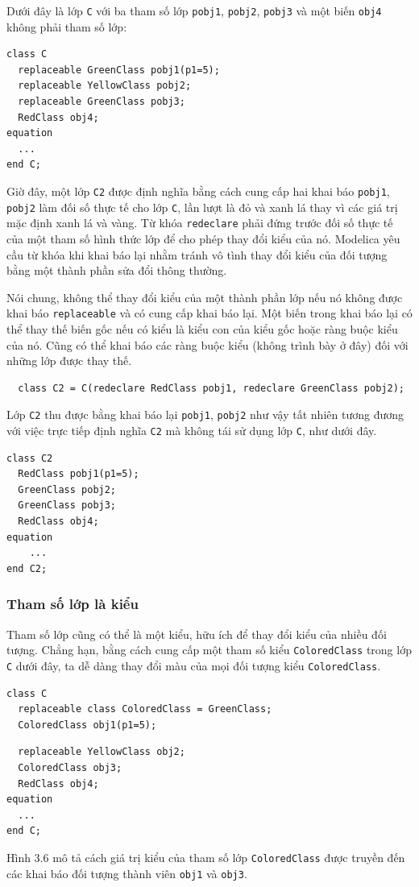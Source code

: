 Dưới đây là lớp \texttt{C} với ba tham số lớp \texttt{pobj1}, \texttt{pobj2}, \texttt{pobj3} và một biến \texttt{obj4} không phải tham số lớp:
\begin{verbatim}
class C
  replaceable GreenClass pobj1(p1=5);
  replaceable YellowClass pobj2;
  replaceable GreenClass pobj3;
  RedClass obj4;
equation
  ...
end C;
\end{verbatim}
Giờ đây, một lớp \texttt{C2} được định nghĩa bằng cách cung cấp hai khai báo \texttt{pobj1}, \texttt{pobj2} làm đối số thực tế cho lớp \texttt{C}, lần lượt là đỏ và xanh lá thay vì các giá trị mặc định xanh lá và vàng. Từ khóa \texttt{redeclare} phải đứng trước đối số thực tế của một tham số hình thức lớp để cho phép thay đổi kiểu của nó. Modelica yêu cầu từ khóa khi khai báo lại nhằm tránh vô tình thay đổi kiểu của đối tượng bằng một thành phần sửa đổi thông thường.

Nói chung, không thể thay đổi kiểu của một thành phần lớp nếu nó không được khai báo \texttt{replaceable} và có cung cấp khai báo lại. Một biến trong khai báo lại có thể thay thế biến gốc nếu có kiểu là kiểu con của kiểu gốc hoặc ràng buộc kiểu của nó. Cũng có thể khai báo các ràng buộc kiểu (không trình bày ở đây) đối với những lớp được thay thế.
\begin{verbatim}
  class C2 = C(redeclare RedClass pobj1, redeclare GreenClass pobj2);
\end{verbatim}
Lớp \texttt{C2} thu được bằng khai báo lại \texttt{pobj1}, \texttt{pobj2} như vậy tất nhiên tương đương với việc trực tiếp định nghĩa \texttt{C2} mà không tái sử dụng lớp \texttt{C}, như dưới đây.
\begin{verbatim}
class C2
  RedClass pobj1(p1=5);
  GreenClass pobj2;
  GreenClass pobj3;
  RedClass obj4;
equation
    ...
end C2;
\end{verbatim}

\subsubsection{Tham số lớp là kiểu}
Tham số lớp cũng có thể là một kiểu, hữu ích để thay đổi kiểu của nhiều đối tượng. Chẳng hạn, bằng cách cung cấp một tham số kiểu \texttt{ColoredClass} trong lớp \texttt{C} dưới đây, ta dễ dàng thay đổi màu của mọi đối tượng kiểu \texttt{ColoredClass}.
\begin{verbatim}
class C
  replaceable class ColoredClass = GreenClass;
  ColoredClass obj1(p1=5);
\end{verbatim}
\begin{verbatim}
  replaceable YellowClass obj2;
  ColoredClass obj3;
  RedClass obj4;
equation
  ...
end C;
\end{verbatim}
Hình 3.6 mô tả cách giá trị kiểu của tham số lớp \texttt{ColoredClass} được truyền đến các khai báo đối tượng thành viên \texttt{obj1} và \texttt{obj3}.

